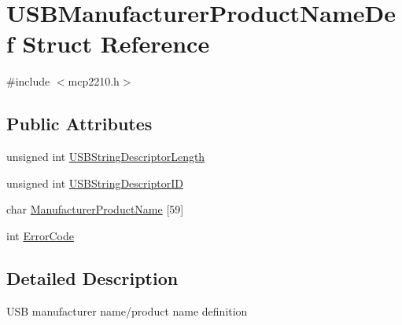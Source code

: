 \hypertarget{struct_u_s_b_manufacturer_product_name_def}{\section{\-U\-S\-B\-Manufacturer\-Product\-Name\-Def \-Struct \-Reference}
\label{struct_u_s_b_manufacturer_product_name_def}
}


{\ttfamily \#include $<$mcp2210.\-h$>$}

\subsection*{\-Public \-Attributes}
\begin{DoxyCompactItemize}
\item 
unsigned int \hyperlink{struct_u_s_b_manufacturer_product_name_def_a652bd4d49243f3af5c11683e71f602b5}{\-U\-S\-B\-String\-Descriptor\-Length}
\item 
unsigned int \hyperlink{struct_u_s_b_manufacturer_product_name_def_ae409e58b5ea1d4e324a85479f8a2af1e}{\-U\-S\-B\-String\-Descriptor\-I\-D}
\item 
char \hyperlink{struct_u_s_b_manufacturer_product_name_def_a5ee96141e688b5dbe654fb4d868ece8b}{\-Manufacturer\-Product\-Name} \mbox{[}59\mbox{]}
\item 
int \hyperlink{struct_u_s_b_manufacturer_product_name_def_acdb38e1f079bea85d75f688033e913b1}{\-Error\-Code}
\end{DoxyCompactItemize}


\subsection{\-Detailed \-Description}
\-U\-S\-B manufacturer name/product name definition 

